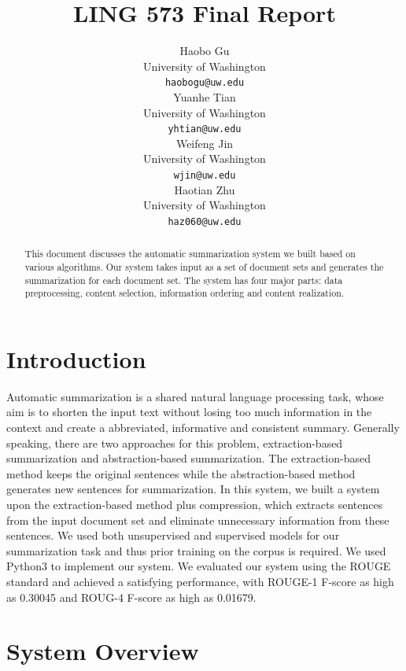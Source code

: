 \documentclass[11pt]{article}
\title{LING 573 Final Report}
\author{Haobo Gu \\
  \small University of Washington \\
  {\tt haobogu@uw.edu} \\\And
 Yuanhe Tian \\
 \small University of Washington \\
  {\tt yhtian@uw.edu}\\\And
 Weifeng Jin \\
 \small University of Washington \\
  {\tt wjin@uw.edu} \\\And
 Haotian Zhu \\
 \small University of Washington \\
  {\tt haz060@uw.edu}\\}
\date{}
\begin{document}
\maketitle
\begin{abstract}

This document discusses the automatic summarization system we built based on various algorithms. Our system takes input as a set of document sets and generates the summarization for each document set. The system has four major parts: data preprocessing, content selection, information ordering and content realization.

\end{abstract}

\section{Introduction}

Automatic summarization is a shared natural language processing task, whose aim is to shorten the input text without losing too much information in the context and create a abbreviated, informative and consistent summary. Generally speaking, there are two approaches for this problem, extraction-based summarization and abstraction-based summarization. The extraction-based method keeps the original sentences while the abstraction-based method generates new sentences for summarization. In this system, we built a system upon the extraction-based method plus compression, which extracts sentences from the input document set and eliminate unnecessary information from these sentences. We used both unsupervised and supervised models for our summarization task and thus prior training on the corpus is required. We used Python3 to implement our system. We evaluated our system using the ROUGE standard and achieved a satisfying performance, with ROUGE-1 F-score as high as 0.30045 and ROUG-4 F-score as high as 0.01679.
\section{System Overview}
\end{document}
